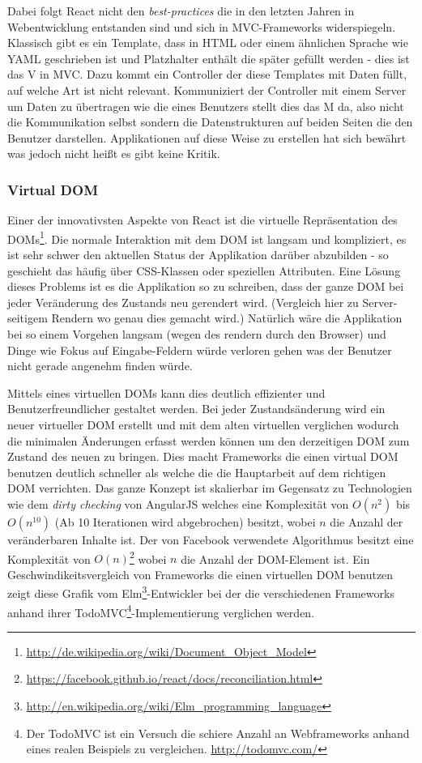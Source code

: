 \documentclass[12pt,twoside]{book}
\begin{document}
Dabei folgt React nicht den \textit{best-practices} die in den letzten Jahren in Webentwicklung entstanden sind und sich in MVC-Frameworks widerspiegeln. Klassisch gibt es ein Template, dass in HTML oder einem ähnlichen Sprache wie YAML geschrieben ist und Platzhalter enthält die später gefüllt werden - dies ist das V in MVC.
Dazu kommt ein Controller der diese Templates mit Daten füllt, auf welche Art ist nicht relevant. Kommuniziert der Controller mit einem Server um Daten zu übertragen wie die eines Benutzers stellt dies das M da, also nicht die Kommunikation selbst sondern die Datenstrukturen auf beiden Seiten die den Benutzer darstellen.
Applikationen auf diese Weise zu erstellen hat sich bewährt was jedoch nicht heißt es gibt keine Kritik.

\subsubsection{Virtual DOM}

Einer der innovativsten Aspekte von React ist die virtuelle Repräsentation des DOMs\footnote{\url{http://de.wikipedia.org/wiki/Document_Object_Model}}. Die normale Interaktion mit dem DOM ist langsam und kompliziert, es ist sehr schwer den aktuellen Status der Applikation darüber abzubilden - so geschieht das häufig über CSS-Klassen oder speziellen Attributen.
Eine Lösung dieses Problems ist es die Applikation so zu schreiben, dass der ganze DOM bei jeder Veränderung des Zustands neu gerendert wird. (Vergleich hier zu Server-seitigem Rendern wo genau dies gemacht wird.) Natürlich wäre die Applikation bei so einem Vorgehen langsam (wegen des rendern durch den Browser) und Dinge wie Fokus auf Eingabe-Feldern würde verloren gehen was der Benutzer nicht gerade angenehm finden würde.

Mittels eines virtuellen DOMs kann dies deutlich effizienter und Benutzerfreundlicher gestaltet werden. Bei jeder Zustandsänderung wird ein neuer virtueller DOM erstellt und mit dem alten virtuellen verglichen wodurch die minimalen Änderungen erfasst werden können um den derzeitigen DOM zum Zustand des neuen zu bringen. Dies macht Frameworks die einen virtual DOM benutzen deutlich schneller als welche die die Hauptarbeit auf dem richtigen DOM verrichten. Das ganze Konzept ist skalierbar im Gegensatz zu Technologien wie dem \textit{dirty checking} von AngularJS welches eine Komplexität von $O(n^2)$ bis $O(n^10)$ (Ab 10 Iterationen wird abgebrochen) besitzt, wobei $n$ die Anzahl der veränderbaren Inhalte ist.
Der von Facebook verwendete Algorithmus besitzt eine Komplexität von $O(n)$\footnote{\url{https://facebook.github.io/react/docs/reconciliation.html}} wobei $n$ die Anzahl der DOM-Element ist.
Ein Geschwindikeitsvergleich von Frameworks die einen virtuellen DOM benutzen zeigt diese Grafik vom Elm\footnote{\url{http://en.wikipedia.org/wiki/Elm_programming_language}}-Entwickler bei der die verschiedenen Frameworks anhand ihrer TodoMVC\footnote{Der TodoMVC ist ein Versuch die schiere Anzahl an Webframeworks anhand eines realen Beispiels zu vergleichen. \url{http://todomvc.com/}}-Implementierung verglichen werden.
\end{document}
